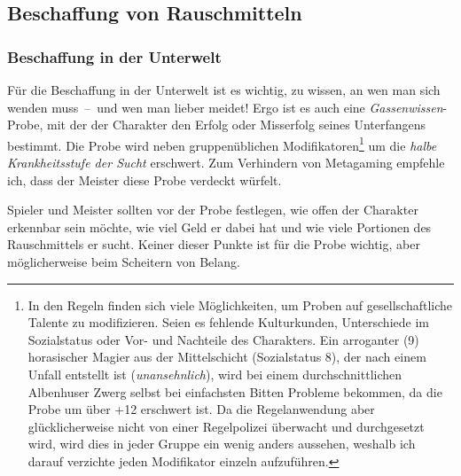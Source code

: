 \subsection{Beschaffung von Rauschmitteln}
\subsubsection{Beschaffung in der Unterwelt\label{beschaffung-unterwelt}}
Für die Beschaffung in der Unterwelt ist es wichtig, zu wissen, an wen man sich wenden muss~--~und wen man lieber meidet! Ergo ist es auch eine \emph{Gassenwissen}-Probe, mit der der Charakter den Erfolg oder Misserfolg seines Unterfangens bestimmt. Die Probe wird neben gruppenüblichen Modifikatoren\footnote{In den Regeln finden sich viele Möglichkeiten, um Proben auf gesellschaftliche Talente zu modifizieren. Seien es fehlende Kulturkunden, Unterschiede im Sozialstatus \cite[S.~276]{WdH} oder Vor- und Nachteile \cite[S.~246~ff.]{WdH} des Charakters. Ein arroganter (9) horasischer Magier aus der Mittelschicht (Sozialstatus 8), der nach einem Unfall entstellt ist (\emph{unansehnlich}), wird bei einem durchschnittlichen Albenhuser Zwerg selbst bei einfachsten Bitten Probleme bekommen, da die Probe um über +12 erschwert ist. Da die Regelanwendung aber glücklicherweise nicht von einer Regelpolizei überwacht und durchgesetzt wird, wird dies in jeder Gruppe ein wenig anders aussehen, weshalb ich darauf verzichte jeden Modifikator einzeln aufzuführen.} um die \emph{halbe Krankheitsstufe der Sucht} erschwert. Zum Verhindern von Metagaming empfehle ich, dass der Meister diese Probe verdeckt würfelt.

Spieler und Meister sollten vor der Probe festlegen, wie offen der Charakter erkennbar sein möchte, wie viel Geld er dabei hat und wie viele Portionen des Rauschmittels er sucht. Keiner dieser Punkte ist für die Probe wichtig, aber möglicherweise beim Scheitern von Belang.


